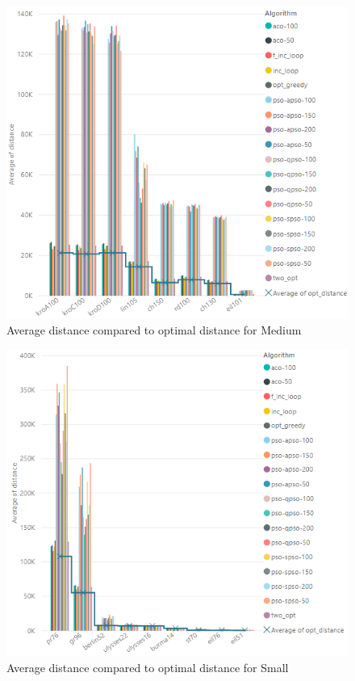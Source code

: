 \documentclass[conference]{IEEEtran}
\begin{document}
	      \begin{figure}[h]
    		\centering
    		\includegraphics[width=\columnwidth]{distance_opt_dostance_medium.png}
    		\caption{Average distance compared to optimal distance for Medium}
    		\label{fig:distanceMedium}
	    \end{figure}
	    
	    \begin{figure}[h]
    		\centering
    		\includegraphics[width=\columnwidth]{distance_opt_dostance_small.png}
    		\caption{Average distance compared to optimal distance for Small}
    		\label{fig:distanceSmall}
	    \end{figure}
	 
\end{document}

